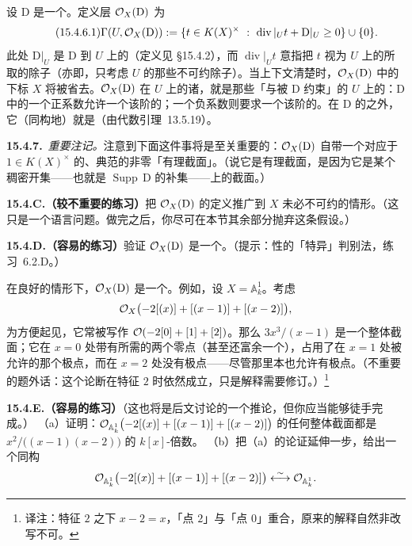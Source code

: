设 $\mathrm{D}$ 是一个\trWeilDivisor。定义层 $\mathcal{O}_X(\mathrm{D})$ 为
\begin{equation*}\tag{15.4.6.1}\label{eq:oxd-sections-definition}
\Gamma(U,\OO_X(\mathrm{D})):=\{t\in K(X)^{\times}\ :\ \operatorname{div}\vert_U t+\mathrm{D}\vert_U\ge 0\}\cup\{0\}.
\end{equation*}
此处 $\mathrm{D}\vert_U$ 是 $\mathrm{D}$ 到 $U$ 上的\trRestriction（定义见 \S15.4.2），而 $\operatorname{div}\vert_U t$ 意指把 $t$ 视为 $U$ 上的\trRationalFunction{}所取的除子（亦即，只考虑 $U$ 的那些不可约除子）。当上下文清楚时，$\mathcal{O}_X(\mathrm{D})$ 中的下标 $X$ 将被省去。$\mathcal{O}_X(\mathrm{D})$ 在 $U$ 上的诸\trSection，就是那些「\trPole{}与\trZeros{}被 $\mathrm{D}$ 约束」的 $U$ 上的\trRationalFunction：$\mathrm{D}$ 中的一个正系数允许一个该阶的\trPole；一个负系数则要求一个该阶的\trZeros。在 $\mathrm{D}$ 的\trSupport{}之外，它（同构地）就是\trStructureSheaf（由代数\trHartogs{}引理~13.5.19）。

\textbf{15.4.7.}\ \emph{重要注记。}\quad 注意到下面这件事将是至关重要的：$\mathcal{O}_X(\mathrm{D})$ 自带一个对应于 $1\in K(X)^{\times}$ 的、典范的非零「有理截面」。（说它是有理截面，是因为它是某个稠密开集——也就是 $\operatorname{Supp}\,\mathrm{D}$ 的补集——上的截面。）

\textbf{15.4.C.（较不重要的练习）}\quad 把 $\mathcal{O}_X(\mathrm{D})$ 的定义推广到 $X$ 未必不可约的情形。（这只是一个语言问题。做完之后，你尽可在本节其余部分抛弃这条假设。）

\textbf{15.4.D.（容易的练习）}\quad 验证 $\mathcal{O}_X(\mathrm{D})$ 是一个\trQCSheaf。（提示：\trQC{}性的「特异\trAffine」判别法，\mbox{练习~6.2.D}。）

在良好的情形下，$\mathcal{O}_X(\mathrm{D})$ 是一个\trInvertibleSheaf。例如，设 $X=\mathbb{A}^1_k$。考虑
\[
\mathcal{O}_X\bigl(-2[(x)]+[(x-1)]+[(x-2)]\bigr),
\]
为方便起见，它常被写作 $\mathcal{O}(-2[0]+[1]+[2])$。那么 $3x^3/(x-1)$ 是一个整体截面；它在 $x=0$ 处带有所需的两个零点（甚至还富余一个），占用了在 $x=1$ 处被允许的那个极点，而在 $x=2$ 处没有极点——尽管那里本也允许有极点。（不重要的题外话：这个论断在特征 $2$ 时依然成立，只是解释需要修订。）\footnote{译注：特征 $2$ 之下 $x-2=x$，「点 $2$」与「点 $0$」重合，原来的解释自然非改写不可。}

\textbf{15.4.E.（容易的练习）}\quad （这也将是后文讨论的一个推论，但你应当能够徒手完成。）
（a）证明：$\mathcal{O}_{\mathbb{A}^1_k}\bigl(-2[(x)]+[(x-1)]+[(x-2)]\bigr)$ 的任何整体截面都是 $x^2/\bigl((x-1)(x-2)\bigr)$ 的 $k[x]$-倍数。
（b）把（a）的论证延伸一步，给出一个同构
\[
\mathcal{O}_{\mathbb{A}^1_k}\bigl(-2[(x)]+[(x-1)]+[(x-2)]\bigr)\overset{\sim}{\longleftrightarrow}\mathcal{O}_{\mathbb{A}^1_k}.
\]

